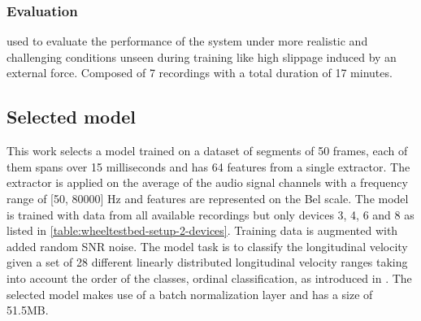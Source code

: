 \subsubsection{Evaluation} \label{subsubsec:evaluatio-dataset}
used to evaluate the performance of the system under more realistic and
challenging conditions unseen during training like high slippage induced by an
external force. Composed of 7 recordings with a total duration of 17 minutes.

\subsection{Selected model} \label{subsec:selected-model} 


This work selects a model trained on a dataset of segments of 50 frames, each
of them spans over 15 milliseconds and has 64 features from a single
 extractor. The extractor is applied on
the average of the audio signal channels with a frequency range of [50, 80000]
Hz and features are represented on the Bel scale. The model is trained with
data from all available recordings but only devices 3, 4, 6 and 8 as listed in
\cref{table:wheeltestbed-setup-2-devices}. Training data is augmented with
added random SNR noise. The model task is to classify the longitudinal velocity
given a set of 28 different linearly distributed longitudinal velocity ranges
taking into account the order of the classes, ordinal classification, as
introduced in \cite{ordclass2006}. The selected model makes use of a batch
normalization layer and has a size of 51.5MB. 